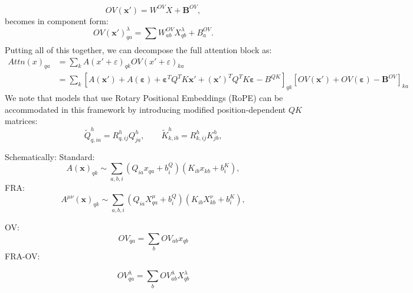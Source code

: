 \documentclass[11pt]{article}
\theoremstyle{definition}
\theoremstyle{plain}
\theoremstyle{remark}
\begin{document}
\begin{equation}
    OV(\mathbf{x}')=W^{OV}X+\mathbf{B}^{OV},
\end{equation}
becomes in component form:
\begin{equation}
    OV(\mathbf{x}')^{\lambda}_{q a}=\sum_{}W^{OV}_{a b}X^\lambda_{q b}+B^{OV}_{a}.
\end{equation}
Putting all of this together, we can decompose the full attention block as:
\begin{align}
    Attn(x)_{q a}&=\sum_{k}A(x'+\varepsilon)_{q k}OV(x'+\varepsilon)_{k a}\\
    &=\sum_{k}\left[        A(\mathbf{x}')+A(\boldsymbol{\varepsilon})+\boldsymbol{\varepsilon}^TQ^TK\mathbf{x}'+(\mathbf{x}')^TQ^TK\boldsymbol{\varepsilon}-B^{QK}
    \right]_{qk}
    \left[
    OV(\mathbf{x}')+OV(\boldsymbol{\varepsilon})-\mathbf{B}^{OV}
    \right]_{k a}
\end{align}
We note that models that use Rotary Positional Embeddings (RoPE) can be accommodated in this framework by introducing modified position-dependent $QK$ matrices:
\begin{equation}
    \tilde Q^h_{q,ia}=R^h_{q,ij}Q^h_{ja},
  \qquad
  \tilde K^h_{k,ib}=R^h_{k,ij}K^h_{jb},
\end{equation}


Schematically: 
Standard:
\begin{equation}
    A(\mathbf{x})_{qk}\sim \sum_{a,b,i}
    \left(
        Q_{i a}x_{q a}+b^{Q}_{i}
    \right)
    \left(
        K_{i b}x_{k b}+b^{K}_{i}
    \right),
\end{equation}
FRA:
\begin{equation}
    A^{\mu\nu}(\mathbf{x})_{qk}\sim \sum_{a,b,i}
    \left(
        Q_{i a}X^\mu_{q a}+b^{Q}_{i}
    \right)
    \left(
        K_{i b}X^\nu_{k b}+b^{K}_{i}
    \right),
\end{equation}

OV:
\begin{equation}
    OV_{q a}=\sum_{b}OV_{a b}x_{q b}
\end{equation}
FRA-OV:

\begin{equation}
    OV^\lambda_{q a}=\sum_{b}OV^\lambda_{a b}X^\lambda_{q b}
\end{equation}







\appendix
\end{document}
